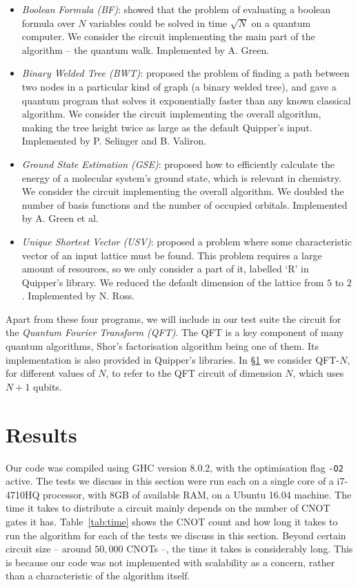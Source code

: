 \begin{itemize}
\item \textit{Boolean Formula (BF)}: \citet{BFWalk} showed that the problem of evaluating a boolean formula over \(N\) variables could be solved in time \(\sqrt{N}\) on a quantum computer. We consider the circuit implementing the main part of the algorithm -- the quantum walk. Implemented by A. Green.

\item \textit{Binary Welded Tree (BWT)}: \citet{BWT} proposed the problem of finding a path between two nodes in a particular kind of graph (a binary welded tree), and gave a quantum program that solves it exponentially faster than any known classical algorithm. We consider the circuit implementing the overall algorithm, making the tree height twice as large as the default Quipper's input. Implemented by P. Selinger and B. Valiron.

\item \textit{Ground State Estimation (GSE)}: \citet{GSE} proposed how to efficiently calculate the energy of a molecular system's ground state, which is relevant in chemistry. We consider the circuit implementing the overall algorithm. We doubled the number of basis functions and the number of occupied orbitals. Implemented by A. Green et al.

\item \textit{Unique Shortest Vector (USV)}: \citet{USV} proposed a problem where some characteristic vector of an input lattice must be found. This problem requires a large amount of resources, so we only consider a part of it, labelled `R' in Quipper's library. We reduced the default dimension of the lattice from \(5\) to \(2\). Implemented by N. Ross.
\end{itemize}

Apart from these four programs, we will include in our test suite the circuit for the \textit{Quantum Fourier Transform (QFT)}. The QFT is a key component of many quantum algorithms, Shor's factorisation algorithm being one of them. Its implementation is also provided in Quipper's libraries. In \S\ref{Results} we consider QFT-\(N\), for different values of \(N\), to refer to the QFT circuit of dimension \(N\), which uses \(N+1\) qubits.

\section{Results}
\label{Results}

Our code was compiled using GHC version 8.0.2, with the optimisation flag \texttt{-O2} active. The tests we discuss in this section were run each on a single core of a i7-4710HQ processor, with 8GB of available RAM, on a Ubuntu 16.04 machine. The time it takes to distribute a circuit mainly depends on the number of CNOT gates it has. Table~\ref{tab:time} shows the CNOT count and how long it takes to run the algorithm for each of the tests we discuss in this section. Beyond certain circuit size -- around \(50,000\) CNOTs --, the time it takes is considerably long. This is because our code was not implemented with scalability as a concern, rather than a characteristic of the algorithm itself.

